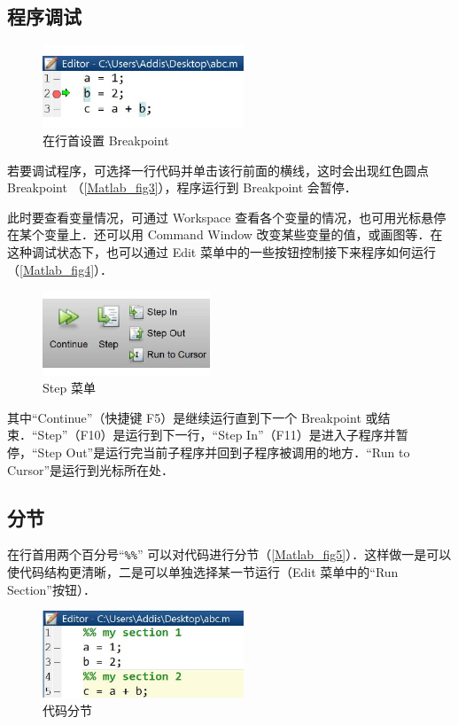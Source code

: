 

\subsection{程序调试}
\begin{figure}[ht]
\centering
\includegraphics[width= 6cm]{./figures/Matlab3.pdf}
\caption{在行首设置 Breakpoint}\label{Matlab_fig3}
\end{figure}

若要调试程序，可选择一行代码并单击该行前面的横线，这时会出现红色圆点 Breakpoint （\autoref{Matlab_fig3}），程序运行到 Breakpoint 会暂停．

此时要查看变量情况，可通过 Workspace 查看各个变量的情况，也可用光标悬停在某个变量上．还可以用 Command Window 改变某些变量的值，或画图等．在这种调试状态下，也可以通过 Edit 菜单中的一些按钮控制接下来程序如何运行（\autoref{Matlab_fig4}）．
\begin{figure}[ht]
\centering
\includegraphics[width= 5cm]{./figures/Matlab4.pdf}
\caption{Step 菜单}\label{Matlab_fig4}
\end{figure}
其中“Continue”（快捷键 F5）是继续运行直到下一个 Breakpoint 或结束．“Step”（F10）是运行到下一行，“Step In”（F11）是进入子程序并暂停，“Step Out”是运行完当前子程序并回到子程序被调用的地方．“Run to Cursor”是运行到光标所在处．

\subsection{分节}
在行首用两个百分号“\texttt{\%\%}” 可以对代码进行分节（\autoref{Matlab_fig5}）．这样做一是可以使代码结构更清晰，二是可以单独选择某一节运行（Edit 菜单中的“Run Section”按钮）．
\begin{figure}[ht]
\centering
\includegraphics[width= 6cm]{./figures/Matlab5.pdf}
\caption{代码分节}\label{Matlab_fig5}
\end{figure}

